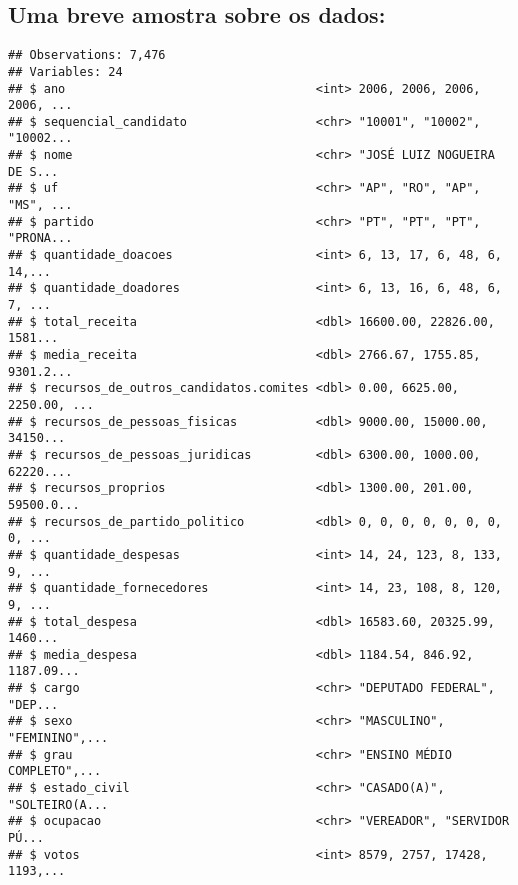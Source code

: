 \documentclass[]{article}
\newenvironment{Shaded}{\begin{snugshade}}{\end{snugshade}}
\newcommand{\KeywordTok}[1]{\textcolor[rgb]{0.13,0.29,0.53}{\textbf{#1}}}
\newcommand{\StringTok}[1]{\textcolor[rgb]{0.31,0.60,0.02}{#1}}
\newcommand{\OperatorTok}[1]{\textcolor[rgb]{0.81,0.36,0.00}{\textbf{#1}}}
\newcommand{\NormalTok}[1]{#1}
\begin{document}
\subsection{Uma breve amostra sobre os
dados:}\label{uma-breve-amostra-sobre-os-dados}

\begin{Shaded}
\end{Shaded}

\begin{verbatim}
## Observations: 7,476
## Variables: 24
## $ ano                                   <int> 2006, 2006, 2006, 2006, ...
## $ sequencial_candidato                  <chr> "10001", "10002", "10002...
## $ nome                                  <chr> "JOSÉ LUIZ NOGUEIRA DE S...
## $ uf                                    <chr> "AP", "RO", "AP", "MS", ...
## $ partido                               <chr> "PT", "PT", "PT", "PRONA...
## $ quantidade_doacoes                    <int> 6, 13, 17, 6, 48, 6, 14,...
## $ quantidade_doadores                   <int> 6, 13, 16, 6, 48, 6, 7, ...
## $ total_receita                         <dbl> 16600.00, 22826.00, 1581...
## $ media_receita                         <dbl> 2766.67, 1755.85, 9301.2...
## $ recursos_de_outros_candidatos.comites <dbl> 0.00, 6625.00, 2250.00, ...
## $ recursos_de_pessoas_fisicas           <dbl> 9000.00, 15000.00, 34150...
## $ recursos_de_pessoas_juridicas         <dbl> 6300.00, 1000.00, 62220....
## $ recursos_proprios                     <dbl> 1300.00, 201.00, 59500.0...
## $ recursos_de_partido_politico          <dbl> 0, 0, 0, 0, 0, 0, 0, 0, ...
## $ quantidade_despesas                   <int> 14, 24, 123, 8, 133, 9, ...
## $ quantidade_fornecedores               <int> 14, 23, 108, 8, 120, 9, ...
## $ total_despesa                         <dbl> 16583.60, 20325.99, 1460...
## $ media_despesa                         <dbl> 1184.54, 846.92, 1187.09...
## $ cargo                                 <chr> "DEPUTADO FEDERAL", "DEP...
## $ sexo                                  <chr> "MASCULINO", "FEMININO",...
## $ grau                                  <chr> "ENSINO MÉDIO COMPLETO",...
## $ estado_civil                          <chr> "CASADO(A)", "SOLTEIRO(A...
## $ ocupacao                              <chr> "VEREADOR", "SERVIDOR PÚ...
## $ votos                                 <int> 8579, 2757, 17428, 1193,...
\end{verbatim}
\end{document}
